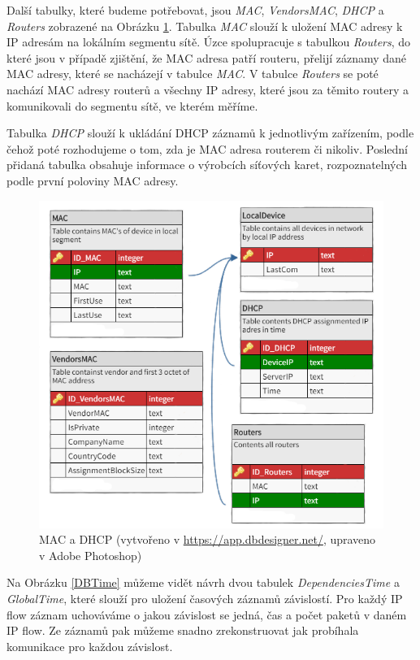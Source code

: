 \documentclass[thesis=B,czech,hidelinks]{FITthesis}[2019/03/21]
\begin{document}
        Další tabulky, které budeme potřebovat, jsou \emph{MAC}, \emph{VendorsMAC}, \emph{DHCP} a \emph{Routers} zobrazené na Obrázku \ref{DBMAC}. Tabulka \emph{MAC} slouží k uložení MAC adresy k IP adresám na lokálním segmentu sítě. Úzce spolupracuje s tabulkou \emph{Routers}, do které jsou v případě zjištění, že MAC adresa patří routeru, přelijí záznamy dané MAC adresy, které se nacházejí v tabulce \emph{MAC}. V tabulce \emph{Routers} se poté nachází MAC adresy routerů a všechny IP adresy, které jsou za těmito routery a komunikovali do segmentu sítě, ve kterém měříme.
        
        Tabulka \emph{DHCP} slouží k ukládání DHCP záznamů k jednotlivým zařízením, podle čehož poté rozhodujeme o tom, zda je MAC adresa routerem či nikoliv. Poslední přidaná tabulka obsahuje informace o výrobcích síťových karet, rozpoznatelných podle první poloviny MAC adresy.
        
        \begin{figure}[h]
            \centering
            \includegraphics[width=\textwidth]{databaze_MAC.png}
            \caption[MAC a DHCP]{MAC a DHCP (vytvořeno v \url{https://app.dbdesigner.net/}, upraveno v Adobe Photoshop) }
            \label{DBMAC}
        \end{figure}
        
        \newpage
        
        Na Obrázku \ref{DBTime} můžeme vidět návrh dvou tabulek \emph{DependenciesTime} a \emph{GlobalTime}, které slouží pro uložení časových záznamů závislostí. Pro každý IP flow záznam uchováváme o jakou závislost se jedná, čas a počet paketů v daném IP flow. Ze záznamů pak můžeme snadno zrekonstruovat jak probíhala komunikace pro každou závislost.
        
\end{document}
